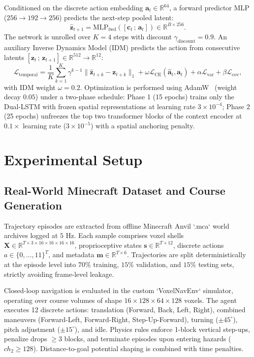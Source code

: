\documentclass{svproc}
\begin{document}
Conditioned on the discrete action embedding $\mathbf{a}_t \in \mathbb{R}^{64}$, a forward predictor MLP ($256 \to 192 \to 256$) predicts the next-step pooled latent:
\begin{equation}
\hat{\mathbf{z}}_{t+1} = \mathrm{MLP}_{\text{fwd}}\left(\left[\mathbf{c}_t\,;\,\mathbf{a}_t\right]\right) \in \mathbb{R}^{B \times 256}.
\end{equation}
The network is unrolled over $K = 4$ steps with discount $\gamma_{\text{discount}} = 0.9$. An auxiliary Inverse Dynamics Model (IDM) predicts the action from consecutive latents $[\mathbf{z}_t\,;\,\mathbf{z}_{t+1}] \in \mathbb{R}^{512} \to \mathbb{R}^{12}$:
\begin{equation}
\mathcal{L}_{\text{temporal}} = \frac{1}{K} \sum_{k=1}^K \gamma^{k-1} \|\hat{\mathbf{z}}_{t+k} - \mathbf{z}_{t+k}\|_1 + \omega \mathcal{L}_{\text{CE}}(\hat{\mathbf{a}}_t, \mathbf{a}_t) + \alpha \mathcal{L}_{\text{var}} + \beta \mathcal{L}_{\text{cov}},
\end{equation}
with IDM weight $\omega = 0.2$. Optimization is performed using AdamW~\cite{loshchilov2019adamw} (weight decay $0.05$) under a two-phase schedule: Phase 1 (15 epochs) trains only the Dual-LSTM with frozen spatial representations at learning rate $3 \times 10^{-4}$; Phase 2 (25 epochs) unfreezes the top two transformer blocks of the context encoder at $0.1\times$ learning rate ($3 \times 10^{-5}$) with a spatial anchoring penalty.

\section{Experimental Setup}

\subsection{Real-World Minecraft Dataset and Course Generation}
Trajectory episodes are extracted from offline Minecraft Anvil `.mca` world archives logged at $5\text{ Hz}$. Each sample comprises voxel shells $\mathbf{X} \in \mathbb{R}^{T \times 3 \times 16 \times 16 \times 16 \times 16}$, proprioceptive states $\mathbf{s} \in \mathbb{R}^{T \times 12}$, discrete actions $a \in \{0, \dots, 11\}^T$, and metadata $\mathbf{m} \in \mathbb{R}^{T \times 6}$. Trajectories are split deterministically at the episode level into $70\%$ training, $15\%$ validation, and $15\%$ testing sets, strictly avoiding frame-level leakage.

Closed-loop navigation is evaluated in the custom `VoxelNavEnv` simulator, operating over course volumes of shape $16 \times 128 \times 64 \times 128$ voxels. The agent executes 12 discrete actions: translation (Forward, Back, Left, Right), combined maneuvers (Forward-Left, Forward-Right, Step-Up-Forward), turning ($\pm 45^\circ$), pitch adjustment ($\pm 15^\circ$), and idle. Physics rules enforce 1-block vertical step-ups, penalize drops $\ge 3$ blocks, and terminate episodes upon entering hazards ($ch_2 \ge 128$). Distance-to-goal potential shaping is combined with time penalties.
\end{document}

